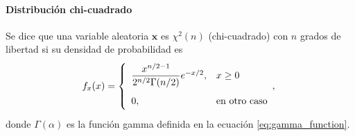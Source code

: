 \documentclass[a4paper]{report}
\newcommand{\x}{\mathbf{x}}
\begin{document}
\paragraph{Distribución chi-cuadrado}

Se dice que una variable aleatoria \(\x\) es \(\chi^2(n)\) (chi-cuadrado) con \(n\) grados de libertad si su densidad de probabilidad es
\begin{equation}\label{eq:pdf_chi_square}
\def\arraystretch{2.0}
 f_x(x)=
 \left\{\begin{array}{ll}
  \dfrac{x^{n/2-1}}{2^{n/2}\Gamma(n/2)} e^{-x/2}, & x\geq 0\\
  0, & \textrm{en otro caso}
 \end{array}, \right.
\end{equation}
donde \(\Gamma(\alpha)\) es la función gamma definida en la ecuación \ref{eq:gamma_function}.
\end{document}
